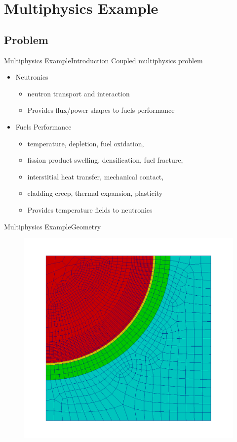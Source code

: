 \documentclass{beamer}
\begin{document}
\section{Multiphysics Example}
\subsection{Problem}
\begin{frame}{Multiphysics Example}{Introduction}\vspace{-20pt}
  \vfill
Coupled multiphysics problem
  \vfill
\begin{itemize}
  \item Neutronics
    \begin{itemize}
      \item neutron transport and interaction
      \item Provides flux/power shapes to fuels performance
    \end{itemize}
  \vfill
  \item Fuels Performance
    \begin{itemize}
      \item temperature, depletion, fuel oxidation, 
      \item fission product swelling, densification, fuel fracture,
      \item interstitial heat transfer, mechanical contact,
      \item cladding creep, thermal expansion, plasticity
      \item Provides temperature fields to neutronics
    \end{itemize}
\end{itemize}
  \vfill
\end{frame}

\begin{frame}{Multiphysics Example}{Geometry}\vspace{-20pt}
      \begin{figure}
        \centering
        \includegraphics[width=0.8\linewidth]{mammoth/NeutronicsMesh}
      \end{figure}
\end{frame}
\end{document}
